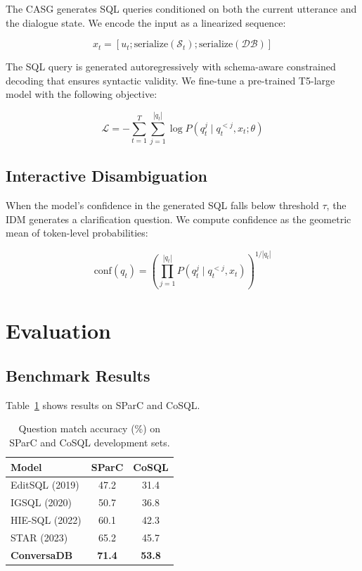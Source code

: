 \documentclass[sigconf,nonacm]{acmart}
\begin{document}
The CASG generates SQL queries conditioned on both the current utterance and the dialogue state. We encode the input as a linearized sequence:

\begin{equation}
x_t = [u_t; \text{serialize}(\mathcal{S}_t); \text{serialize}(\mathcal{DB})]
\end{equation}

The SQL query is generated autoregressively with schema-aware constrained decoding that ensures syntactic validity. We fine-tune a pre-trained T5-large model with the following objective:

\begin{equation}
\mathcal{L} = -\sum_{t=1}^{T} \sum_{j=1}^{|q_t|} \log P(q_t^j \mid q_t^{<j}, x_t; \theta)
\end{equation}

\subsection{Interactive Disambiguation}

When the model's confidence in the generated SQL falls below threshold $\tau$, the IDM generates a clarification question. We compute confidence as the geometric mean of token-level probabilities:

\begin{equation}
\text{conf}(q_t) = \left( \prod_{j=1}^{|q_t|} P(q_t^j \mid q_t^{<j}, x_t) \right)^{1/|q_t|}
\end{equation}

\section{Evaluation}

\subsection{Benchmark Results}

Table~\ref{tab:benchmark} shows results on SParC and CoSQL.

\begin{table}[t]
\caption{Question match accuracy (\%) on SParC and CoSQL development sets.}
\label{tab:benchmark}
\begin{tabular}{@{}lcc@{}}
\toprule
\textbf{Model} & \textbf{SParC} & \textbf{CoSQL} \\
\midrule
EditSQL (2019)           & 47.2 & 31.4 \\
IGSQL (2020)             & 50.7 & 36.8 \\
HIE-SQL (2022)           & 60.1 & 42.3 \\
STAR (2023)              & 65.2 & 45.7 \\
\midrule
\textbf{ConversaDB}      & \textbf{71.4} & \textbf{53.8} \\
\bottomrule
\end{tabular}
\end{table}
\end{document}
